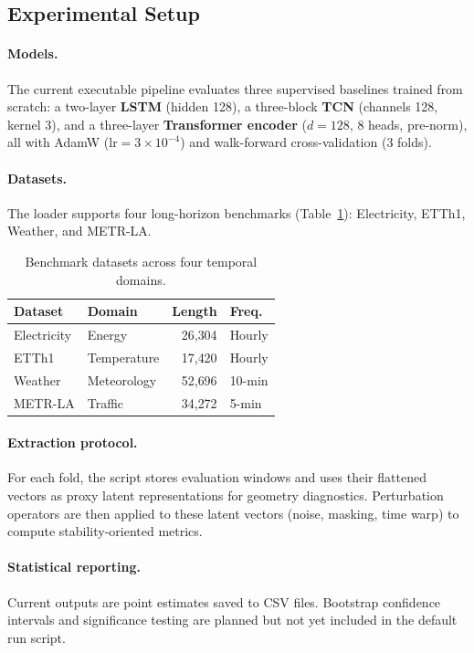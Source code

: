 \documentclass[letterpaper,twocolumn]{article}
\begin{document}
\subsection{Experimental Setup}
\label{sec:setup}

\paragraph{Models.}
The current executable pipeline evaluates three supervised baselines trained
from scratch: a two-layer
\textbf{LSTM} (hidden 128), a three-block \textbf{TCN} (channels 128, kernel 3),
and a three-layer \textbf{Transformer encoder} ($d{=}128$, 8 heads, pre-norm),
all with AdamW ($\mathrm{lr}{=}3{\times}10^{-4}$) and walk-forward cross-validation
(3 folds).

\paragraph{Datasets.}
The loader supports four long-horizon benchmarks (Table~\ref{tab:datasets}):
Electricity, ETTh1, Weather, and METR-LA.

\begin{table}[h]
\centering
\caption{Benchmark datasets across four temporal domains.}
\label{tab:datasets}
\small
\begin{tabular}{llrl}
\toprule
\textbf{Dataset} & \textbf{Domain} & \textbf{Length} & \textbf{Freq.} \\
\midrule
Electricity & Energy      & 26{,}304 & Hourly  \\
ETTh1       & Temperature & 17{,}420 & Hourly  \\
Weather     & Meteorology & 52{,}696 & 10-min  \\
METR-LA     & Traffic     & 34{,}272 & 5-min   \\
\bottomrule
\end{tabular}
\end{table}

\paragraph{Extraction protocol.}
For each fold, the script stores evaluation windows and uses their flattened
vectors as proxy latent representations for geometry diagnostics.
Perturbation operators are then applied to these latent vectors (noise, masking,
time warp) to compute stability-oriented metrics.

\paragraph{Statistical reporting.}
Current outputs are point estimates saved to CSV files.
Bootstrap confidence intervals and significance testing are planned but not yet
included in the default run script.
\end{document}
